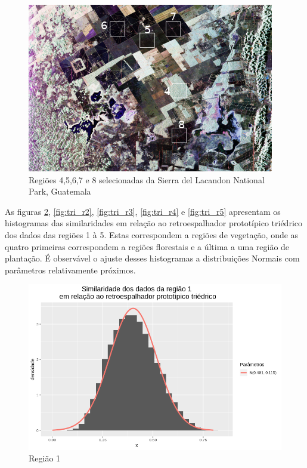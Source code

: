 \documentclass[12pt]{article}
\begin{document}
\begin{figure}[!h]
    \centering
    \includegraphics[width = 0.9\linewidth]{../../Images/Report_18_12_17/guatemala1.png}
    \caption{Regiões 4,5,6,7 e 8 selecionadas da Sierra del Lacandon National Park, Guatemala}
    \label{fig:img2}
\end{figure}
\newpage
As figuras \ref{fig:tri_r1}, \ref{fig:tri_r2}, \ref{fig:tri_r3}, \ref{fig:tri_r4} e \ref{fig:tri_r5} apresentam os histogramas das similaridades em relação ao retroespalhador prototípico triédrico dos dados das regiões 1 à 5. Estas correspondem a regiões de vegetação, onde as quatro primeiras correspondem a regiões florestais e a última a uma região de plantação. 
É observável o ajuste desses histogramas a distribuições Normais com parâmetros relativamente próximos. 

\begin{figure}[!h]
    \centering
    \includegraphics[width = 0.95\linewidth]{../../Images/Report_18_12_17/tri_region1.png}
    \caption{Região 1}
    \label{fig:tri_r1}
\end{figure}
\end{document}
